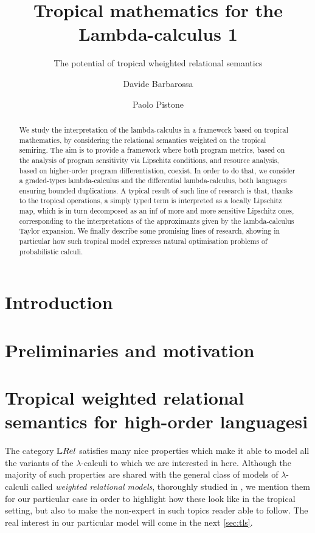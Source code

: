 \documentclass[a4paper,UKenglish,cleveref, autoref, thm-restate]{lipics-v2021}
\title{Tropical mathematics for the Lambda-calculus 1}
\subtitle{The potential of tropical wheighted relational semantics%
} %
\author{Davide {Barbarossa}}{Dipartimento di Informatica, Universit\`a di Bologna, %
Italy%
\and \url{https://lipn.univ-paris13.fr/\~barbarossa/index.html} }{davide.barbarossa@unibo.it}{https://orcid.org/0000-0003-4608-8282}{%
}%
\author{Paolo {Pistone}}{Dipartimento di Informatica, Universit\`a di Bologna, %
Italy%
\and \url{%
} }{paolo.pistone2@unibo.it}{%
}{%
}
\begin{document}
\maketitle

\begin{abstract}
We study the interpretation of the lambda-calculus in a framework based on tropical mathematics, by considering the relational semantics weighted on the tropical semiring. The aim is to provide a framework where both program metrics, based on the analysis of program sensitivity via Lipschitz conditions, and resource analysis, based on higher-order program differentiation, coexist. In order to do that, we consider a graded-types lambda-calculus and the differential lambda-calculus, both languages ensuring bounded duplications.
A typical result of such line of research is that, thanks to the tropical operations, a simply typed term is interpreted as a locally Lipschitz map, which is in turn decomposed as an inf of more and more sensitive Lipschitz ones, corresponding to the interpretations of the approximants given by the lambda-calculus Taylor expansion.
We finally describe some promising lines of research, showing in particular how such tropical model expresses natural optimisation problems of probabilistic calculi.
\end{abstract}

\section{Introduction}



\section{Preliminaries and motivation}


\section{Tropical weighted relational semantics for high-order languagesi}\label{section3}

The category $\LREL$ satisfies many nice properties which make it able to model all the variants of the $\lambda$-calculi to which we are interested in here. Although the majority of such properties are shared with the general class of models of $\lambda$-calculi called \emph{weighted relational models}, thoroughly studied in \cite{Manzo2013}, we mention them for our particular case in order to highlight how these look like in the tropical setting, but also to make the non-expert in such topics reader able to follow.
The real interest in our particular model will come in the next \autoref{sec:tls}.
\end{document}
